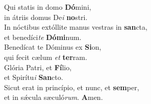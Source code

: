 \evenverse Qui statis in domo \textbf{Dó}mini,~\*\\
\evenverse in átriis domus De\textit{i} \textbf{no}stri.\\
\oddverse In nóctibus extóllite manus vestras in \textbf{san}cta,~\*\\
\oddverse et benedíci\textit{te} \textbf{Dó}\textbf{mi}num.\\
\evenverse Benedícat te Dóminus ex \textbf{Si}on,~\*\\
\evenverse qui fecit cælum \textit{et} \textbf{ter}ram.\\
\oddverse Glória Patri, et \textbf{Fí}lio,~\*\\
\oddverse et Spirítu\textit{i} \textbf{San}cto.\\
\evenverse Sicut erat in princípio, et nunc, et \textbf{sem}per,~\*\\
\evenverse et in sǽcula sæculó\textit{rum}. \textbf{A}men.\\
